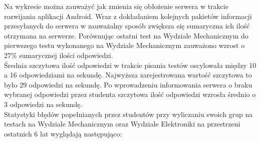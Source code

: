 \documentclass[archivemod, eng]{mgr}
\begin{document}
		\begin{center}
		\end{center}
		
		Na wykresie można zauważyć jak zmienia się obłożenie serwera w trakcie rozwijania aplikacji Android. Wraz z dokładaniem kolejnych pakietów informacji przesyłanych do serwera w zauważalny sposób zwiększa się sumaryczna ich ilość otrzymana na serwerze. Porównując ostatni test na Wydziale Mechanicznym do pierwszego testu wykonanego na Wydziale Mechanicznym zauważono wzrost o 27\% sumarycznej ilości odpowiedzi.\\
		
		Średnia szczytowa ilość odpowiedzi w trakcie pisania testów oscylowała między 10 a 16 odpowiedziami na sekundę. Najwyższa zarejestrowana wartość szczytowa to było 29 odpowiedzi na sekundę. Po wprowadzeniu informowania serwera o braku wybranej odpowiedzi przez studenta szczytowa ilość odpowiedzi wzrosła średnio o 3 odpowiedzi na sekundę.\\
	
		Statystyki błędów popełnianych przez studentów przy wyliczaniu swoich grup na testach na Wydziale Mechanicznym oraz Wydziale Elektroniki na przestrzeni ostatnich 6 lat wyglądają następująco:
		
	
\end{document}
